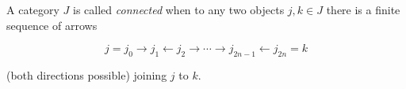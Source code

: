 A category $J$ is called \emph{connected} when to any two objects $j, k \in J$ there is a finite sequence of arrows

\[
j = j_0 \to j_1 \leftarrow j_2 \to \cdots \to j_{2n-1} \leftarrow j_{2n} = k
\]

(both directions possible) joining $j$ to $k$.
